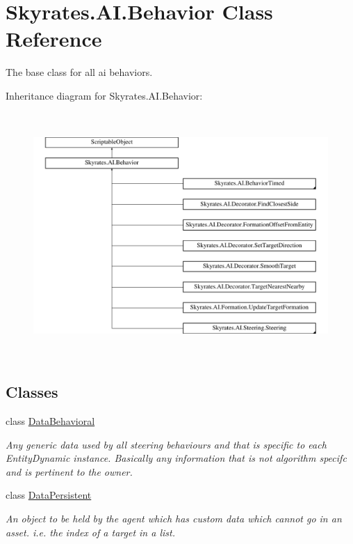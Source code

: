 \hypertarget{class_skyrates_1_1_a_i_1_1_behavior}{\section{Skyrates.\-A\-I.\-Behavior Class Reference}
\label{class_skyrates_1_1_a_i_1_1_behavior}
}


The base class for all ai behaviors.  


Inheritance diagram for Skyrates.\-A\-I.\-Behavior\-:\begin{figure}[H]
\begin{center}
\leavevmode
\includegraphics[height=9.333333cm]{class_skyrates_1_1_a_i_1_1_behavior}
\end{center}
\end{figure}
\subsection*{Classes}
\begin{DoxyCompactItemize}
\item 
class \hyperlink{class_skyrates_1_1_a_i_1_1_behavior_1_1_data_behavioral}{Data\-Behavioral}
\begin{DoxyCompactList}\small\item\em Any generic data used by all steering behaviours and that is specific to each Entity\-Dynamic instance. Basically any information that is not algorithm specifc and is pertinent to the owner. \end{DoxyCompactList}\item 
class \hyperlink{class_skyrates_1_1_a_i_1_1_behavior_1_1_data_persistent}{Data\-Persistent}
\begin{DoxyCompactList}\small\item\em An object to be held by the agent which has custom data which cannot go in an asset. i.\-e. the index of a target in a list. \end{DoxyCompactList}\end{DoxyCompactItemize}
